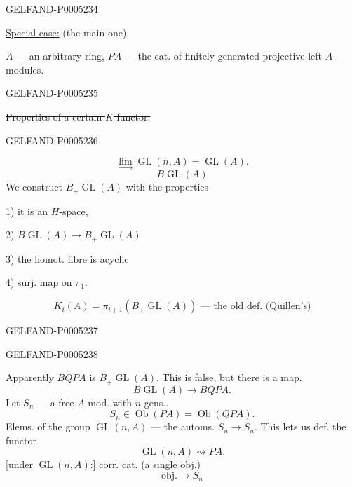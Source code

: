 \begin{GelfandAdjacentEvidence}{GELFAND-P000523}{4}

\uline{Special case:} (the main one).

$A$ — an arbitrary ring, $PA$ — the cat. of finitely generated projective left $A$-modules.
\end{GelfandAdjacentEvidence}
\begin{GelfandAdjacentEvidence}{GELFAND-P000523}{5}


\sout{Properties of a certain \mbox{$K$}-functor.}
\end{GelfandAdjacentEvidence}
\begin{GelfandAdjacentEvidence}{GELFAND-P000523}{6}


\[
\underset{\longrightarrow}{\lim}\operatorname{GL}(n,A)=\operatorname{GL}(A).
\]
\[
B\operatorname{GL}(A)
\]
We construct $B_+\operatorname{GL}(A)$ with the properties

1) it is an $H$-space,

2) $B\operatorname{GL}(A)\longrightarrow B_+\operatorname{GL}(A)$

3) the homot. fibre is acyclic

4) surj. map on $\pi_1$.

\[
K_i(A)=\pi_{i+1}(B_+\operatorname{GL}(A))
\text{ — the old def. (Quillen’s)}
\]
\end{GelfandAdjacentEvidence}
\begin{GelfandAdjacentEvidence}{GELFAND-P000523}{7}


\end{GelfandAdjacentEvidence}
\begin{GelfandAdjacentEvidence}{GELFAND-P000523}{8}

Apparently $BQPA$ is $B_+\operatorname{GL}(A)$. This is false, but there is a map.
\[
B\operatorname{GL}(A)\longrightarrow BQPA.
\]
Let $S_n$ — a free $A$-mod. with $n$ gens..
\[
S_n\in\operatorname{Ob}(PA)=\operatorname{Ob}(QPA).
\]
Elems. of the group $\operatorname{GL}(n,A)$ — the automs. $S_n\longrightarrow S_n$.
This lets us def. the functor
\[
\operatorname{GL}(n,A)\rightsquigarrow PA.
\]
[under $\operatorname{GL}(n,A)$:] corr. cat. (a single obj.)
\[
\text{obj.}\longrightarrow S_n
\]
\end{GelfandAdjacentEvidence}


